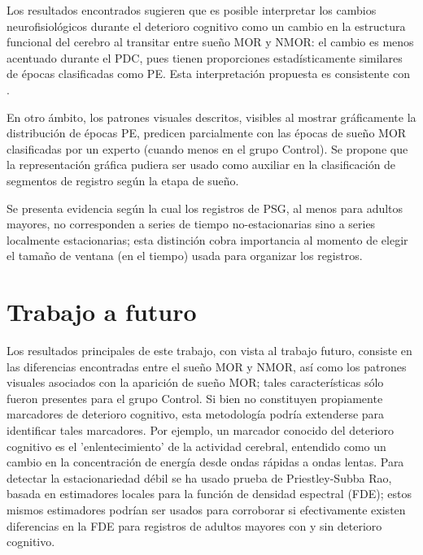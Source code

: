 Los resultados encontrados sugieren que es posible interpretar los cambios neurofisiológicos 
durante el deterioro cognitivo como un cambio en la estructura funcional del cerebro al transitar 
entre sueño MOR y NMOR: el cambio es menos acentuado durante el PDC, pues tienen proporciones 
estadísticamente similares de épocas clasificadas como PE.
Esta interpretación propuesta es consistente con \cite{Valeria}.

En otro ámbito, los patrones visuales descritos, visibles al mostrar gráficamente la 
distribución de épocas PE, predicen parcialmente con las épocas de sueño MOR clasificadas 
por un experto (cuando menos en el grupo Control).
Se propone que la representación gráfica pudiera ser usado como auxiliar en la clasificación 
de segmentos de registro según la etapa de sueño.

Se presenta evidencia según la cual los registros de PSG, al menos para adultos mayores, no 
corresponden a series de tiempo no-estacionarias sino a series localmente estacionarias; esta 
distinción cobra importancia al momento de elegir el tamaño de ventana (en el tiempo) usada 
para organizar los registros.


\section{Trabajo a futuro}

Los resultados principales de este trabajo, con vista al trabajo futuro, consiste en las 
diferencias encontradas entre el sueño MOR y NMOR, así como los patrones visuales asociados con 
la aparición de sueño MOR; tales características sólo fueron presentes para el grupo 
Control. Si bien no constituyen propiamente marcadores de deterioro cognitivo, esta metodología
podría extenderse para identificar tales marcadores.
Por ejemplo, un marcador conocido \cite{Becerra12} del deterioro cognitivo es el 'enlentecimiento' 
de la actividad cerebral, entendido como un cambio en la concentración de energía desde ondas 
rápidas a ondas lentas.
Para detectar la estacionariedad débil se ha usado prueba de Priestley-Subba Rao, basada en 
estimadores locales para la función de densidad espectral (FDE); estos mismos estimadores 
podrían ser usados para corroborar si efectivamente existen diferencias en la FDE para registros 
de adultos mayores con y sin deterioro cognitivo. 

